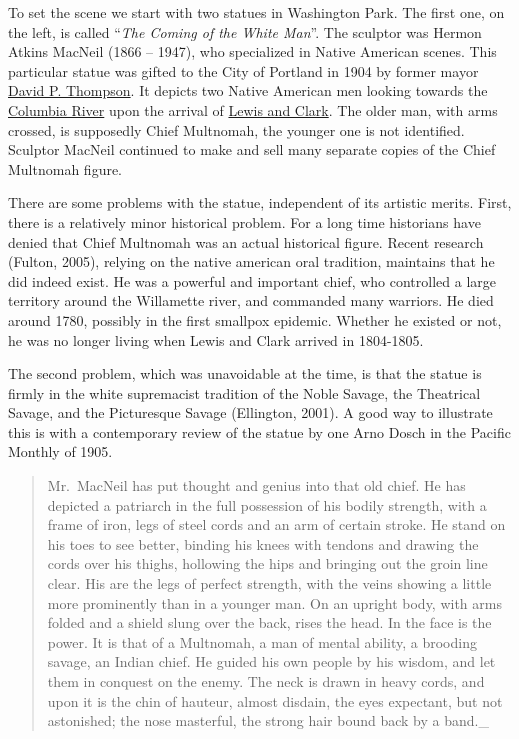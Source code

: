 \documentclass[
  12pt,
]{book}
\begin{document}
To set the scene we start with two statues in Washington Park. The first one, on the left, is called ``\emph{The Coming of the White Man}''. The sculptor was Hermon Atkins MacNeil (1866 -- 1947), who specialized in Native American scenes. This particular statue was gifted to the City of Portland in 1904 by former mayor \href{https://en.wikipedia.org/wiki/David_P._Thompson}{David P. Thompson}. It depicts two Native American men looking towards the \href{https://en.wikipedia.org/wiki/Columbia_River}{Columbia River} upon the arrival of \href{https://en.wikipedia.org/wiki/Lewis_and_Clark_Expedition}{Lewis and Clark}. The older man, with arms crossed, is supposedly Chief Multnomah, the younger one is not identified. Sculptor MacNeil continued to make and sell many separate copies of the Chief Multnomah figure.

There are some problems with the statue, independent of its artistic merits. First, there is a relatively minor historical problem. For a long time historians have denied that Chief Multnomah was an actual historical figure. Recent research (Fulton, 2005), relying on the native american oral tradition, maintains that he did indeed exist. He was a powerful and important chief, who controlled a large territory around the Willamette river, and commanded many warriors. He died around 1780, possibly in the first smallpox epidemic. Whether he existed or not, he was no longer living when Lewis and Clark arrived in 1804-1805.

The second problem, which was unavoidable at the time, is that the statue is firmly in the white supremacist tradition of the Noble Savage, the Theatrical Savage, and the Picturesque Savage (Ellington, 2001). A good way to illustrate this is with a contemporary review of the statue by one Arno Dosch in the Pacific Monthly of 1905.

\begin{quote}
Mr.~MacNeil has put thought and genius into that old chief. He has depicted a patriarch in the full possession of his bodily strength, with a frame of iron, legs of steel cords and an arm of certain stroke. He stand on his toes to see better, binding his knees with tendons and drawing the cords over his thighs, hollowing the hips and bringing out the groin line clear. His are the legs of perfect strength, with the veins showing a little more prominently than in a younger man. On an upright body, with arms folded and a shield slung over the back, rises the head. In the face is the power. It is that of a Multnomah, a man of mental ability, a brooding savage, an Indian chief. He guided his own people by his wisdom, and let them in conquest on the enemy. The neck is drawn in heavy cords, and upon it is the chin of hauteur, almost disdain, the eyes expectant, but not astonished; the nose masterful, the strong hair bound back by a band.\_
\end{quote}
\end{document}
